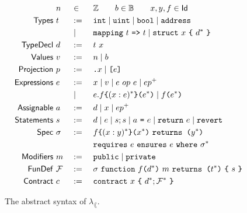 \begin{figure}
  \newcommand{\F}{\mathcal{F}}
  \begin{alignat*}{3}
    &~ n && \in && \mathbb{Z} \qquad b \in \mathbb{B} \qquad x,y,f \in \Typ{Id}   \\
    \Typ{Types} &~ t && :=\ && \Keywd{int} \mid \Keywd{uint} \mid \Keywd{bool} \mid \Keywd{address} \\
                &~   && \mid\ && \Keywd{mapping} ~t~ \Keywd{=>} ~t \mid \Keywd{struct} ~x~ \Keywd{\{}~ d^* ~\Keywd{\}} \\
    \Typ{TypeDecl}    &~ d && :=\ && t ~ x \\
    \Typ{Values}      &~ v && :=\ && n \mid b \\
    \Typ{Projection}  &~ p && :=\ && \Keywd{.}x \mid \Keywd{[}e\Keywd{]} \\
    \Typ{Expressions} &~ e && :=\ && x \mid v \mid e ~op~ e \mid e p^+ \\
                      &~   && \mid\ && e.f\Keywd{\{}(x: e)^*\Keywd{\}(}e^*\Keywd{)}
                              \mid   f\Keywd{(}e^*\Keywd{)}\\
    \Typ{Assignable}  &~ a && :=\ && d \mid x \mid e p^+ \\
    \Typ{Statements}  &~ s && :=\ && d \mid e \mid s; s \mid a ~\Keywd{=}~ e \mid \Keywd{return}~ e \mid \Keywd{revert} \\
    \Typ{Spec}        &~ \sigma && :=\ && f\Keywd{\{}(x : y)^*\Keywd{\}(}x^*\Keywd{)} ~\Keywd{returns (}y^*\Keywd{)} \\
                      &~        &&     && \Keywd{requires}~ e ~\Keywd{ensures}~ e ~\Keywd{where}~ \sigma^* \\
    \Typ{Modifiers}   &~ m && :=\ && \Keywd{public} \mid \Keywd{private} \\
    \Typ{FunDef}      &~ \F&& :=\ && \sigma ~\Keywd{function}~ f\Keywd{(}d^*\Keywd{)} ~ m ~\Keywd{returns (}t^*\Keywd{)} ~\Keywd{\{}~ s ~\Keywd{\}} \\
    \Typ{Contract}    &~ c && :=\ && \Keywd{contract}~ x~ \Keywd{\{}~ d^*; \F^* ~\Keywd{\}}
  \end{alignat*}
  \caption{The abstract syntax of $\lambda_\lang$.}
  \label{fig:syntax}
\end{figure}

\iffalse

